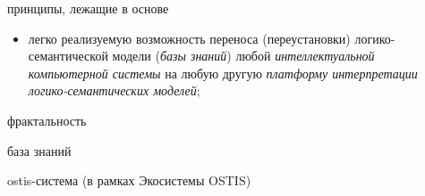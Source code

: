 \begin{SCn}
\begin{scnrelfromlistcustom}{принципы, лежащие в основе}
{\begin{itemize}[labelsep=\tabsize-\bulletsize,leftmargin=\tabsize,label=$\bullet$]
				\item легко реализуемую возможность переноса (переустановки) логико-семантической модели (\textit{базы знаний}) любой \textit{интеллектуальной компьютерной системы} на любую другую \textit{платформу интерпретации логико-семантических моделей};
				\end{itemize}
		}	
		
	\end{scnrelfromlistcustom}
\end{SCn}

\begin{SCn}
	\begin{scnitemize}
		\item фрактальность
		\begin{scnitemize}
			\item база знаний
			\item ostis-система (в рамках Экосистемы OSTIS)
		\end{scnitemize}
	\end{scnitemize}
\end{SCn}

